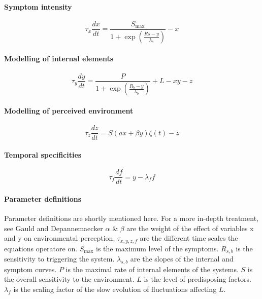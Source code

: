 \documentclass[utf8]{FrontiersinVancouver}
\begin{document}
\paragraph{Symptom intensity}
\begin{equation}
    \tau_{x}\frac{dx}{dt} = \frac{S_{\max}}{1+\exp(\frac{Rs-y}{\lambda_{s}})} - x
\end{equation}


\paragraph{Modelling of internal elements}
\begin{equation}
    \tau_{y}\frac{dy}{dt} = \frac{P}{1+\exp(\frac{R_{b}-y}{\lambda_{b}})} + L - xy - z
\end{equation}

\paragraph{Modelling of perceived environment}
\begin{equation}
    \tau_{z}\frac{dz}{dt} = S(ax + \beta y)\zeta(t) - z
\end{equation}


\paragraph{Temporal specificities}
\begin{equation}
    \tau_f\frac{df}{dt} = y - \lambda_f f
\end{equation}

\paragraph{Parameter definitions}
Parameter definitions are shortly mentioned here. For a more in-depth treatment, see Gauld and Depannemaecker\citep{gauldDynamicalSystemsComputational2023} $\alpha$ \& $\beta$ are the weight of the effect of variables x and y on environmental perception. $\tau_{x,y,z,f}$ are the different time scales the equations operatore on. $S_{\max}$ is the maximum level of the symptoms. $R_{s, b}$ is the sensitivity to triggering the system.  $\lambda_{s,b}$ are the slopes of the internal and symptom curves. $P$ is the maximal rate of internal elements of the systems. $S$ is the overall sensitivity to the environment. $L$ is the level of predisposing factors. $\lambda_{f}$ is the scaling factor of the slow evolution of fluctuations affecting $L$. 
\end{document}
